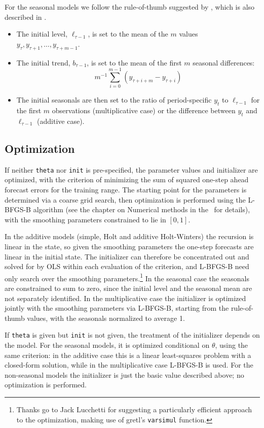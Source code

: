 \documentclass{article}
\begin{document}
For the seasonal models we follow the rule-of-thumb suggested by
\cite{hyndman98}, which is also described in \cite{hyndman2010}.
\begin{itemize}
\item The initial level, $\ell_{\tau-1}$, is set to the mean of the
  $m$ values $y_{\tau}, y_{\tau+1},\dots, y_{\tau+m-1}$.
\item The initial trend, $b_{\tau-1}$, is set to the mean of the
  first $m$ seasonal differences:
 \[
    m^{-1} \sum_{i=0}^{m-1} \left(y_{\tau+i+m} - y_{\tau+i}\right)
 \]
\item The initial seasonals are then set to the ratio of period-specific
  $y_t$ to $\ell_{\tau-1}$ for the first $m$ observations
  (multiplicative case) or the difference between $y_t$ and
  $\ell_{\tau-1}$ (additive case).
\end{itemize}

\subsection{Optimization}

If neither \texttt{theta} nor \texttt{init} is pre-specified, the
parameter values and initializer are optimized, with the criterion of
minimizing the sum of squared one-step ahead forecast errors for the
training range. The starting point for the parameters is determined via
a coarse grid search, then optimization is performed using the L-BFGS-B
algorithm (see the chapter on Numerical methods in the \GUG\ for
details), with the smoothing parameters constrained to lie in $[0,1]$.

In the additive models (simple, Holt and additive Holt-Winters) the
recursion is linear in the state, so given the smoothing parameters the
one-step forecasts are linear in the initial state. The initializer can
therefore be concentrated out and solved for by OLS within each
evaluation of the criterion, and L-BFGS-B need only search over the
smoothing parameters.\footnote{Thanks go to Jack Lucchetti for
  suggesting a particularly efficient approach to the optimization,
  making use of gretl's \texttt{varsimul} function.} In the seasonal
case the seasonals are constrained to sum to zero, since the initial
level and the seasonal mean are not separately identified. In the
multiplicative case the initializer is optimized jointly with the
smoothing parameters via L-BFGS-B, starting from the rule-of-thumb
values, with the seasonals normalized to average 1.
  
If \texttt{theta} is given but \texttt{init} is not given, the treatment
of the initializer depends on the model. For the seasonal models, it is
optimized conditional on $\theta$, using the same criterion: in the
additive case this is a linear least-squares problem with a closed-form
solution, while in the multiplicative case L-BFGS-B is used. For the
non-seasonal models the initializer is just the basic value described
above; no optimization is performed.
  
\end{document}
